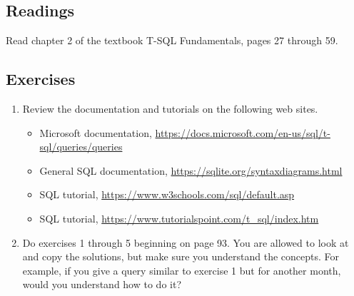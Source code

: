 \documentclass{article}
\begin{document}
        \subsection{Readings}

         Read chapter 2 of the textbook T-SQL Fundamentals, pages 27 through 59.

        \subsection{Exercises}

    \begin{enumerate}

        \item Review the documentation and tutorials on the following web sites.
            \begin{itemize}
                \item Microsoft documentation, \url{https://docs.microsoft.com/en-us/sql/t-sql/queries/queries}
                \item General SQL documentation, \url{https://sqlite.org/syntaxdiagrams.html}
                \item SQL tutorial, \url{https://www.w3schools.com/sql/default.asp}
                \item SQL tutorial, \url{https://www.tutorialspoint.com/t_sql/index.htm}
            \end{itemize}


        \item Do exercises 1 through 5 beginning on page 93. You are allowed to look at and copy the solutions, but make sure you understand the concepts. For example, if you give a query similar to exercise 1 but for another month, would you understand how to do it?

    \end{enumerate}



        
\end{document}
